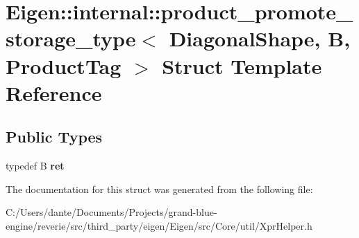 \hypertarget{struct_eigen_1_1internal_1_1product__promote__storage__type_3_01_diagonal_shape_00_01_b_00_01_product_tag_01_4}{}\section{Eigen\+::internal\+::product\+\_\+promote\+\_\+storage\+\_\+type$<$ Diagonal\+Shape, B, Product\+Tag $>$ Struct Template Reference}
\label{struct_eigen_1_1internal_1_1product__promote__storage__type_3_01_diagonal_shape_00_01_b_00_01_product_tag_01_4}
\subsection*{Public Types}
\begin{DoxyCompactItemize}
\item 
\mbox{\label{struct_eigen_1_1internal_1_1product__promote__storage__type_3_01_diagonal_shape_00_01_b_00_01_product_tag_01_4_a3f6b937aa24fb81d1e6febbd20e810d2}} 
typedef B {\bfseries ret}
\end{DoxyCompactItemize}


The documentation for this struct was generated from the following file\+:\begin{DoxyCompactItemize}
\item 
C\+:/\+Users/dante/\+Documents/\+Projects/grand-\/blue-\/engine/reverie/src/third\+\_\+party/eigen/\+Eigen/src/\+Core/util/Xpr\+Helper.\+h\end{DoxyCompactItemize}
